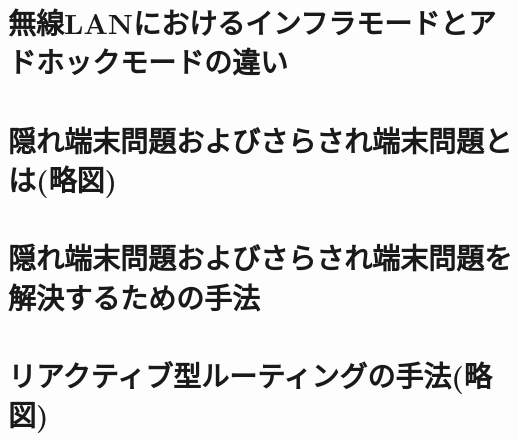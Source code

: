\documentclass[10.5pt]{jsarticle}
\begin{document}
\section{無線LANにおけるインフラモードとアドホックモードの違い}


\section{隠れ端末問題およびさらされ端末問題とは(略図)}


\section{隠れ端末問題およびさらされ端末問題を解決するための手法}


\section{リアクティブ型ルーティングの手法(略図)}
\end{document}
